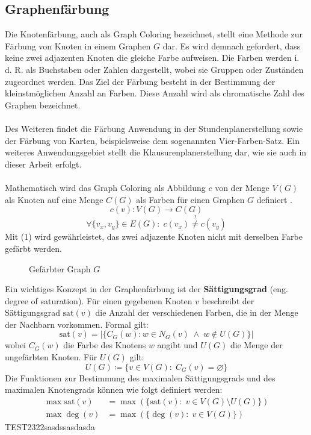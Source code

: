 \subsection{Graphenfärbung}
Die Knotenfärbung, auch als Graph Coloring bezeichnet, stellt eine Methode zur Färbung von Knoten in einem Graphen $G$ dar. 
Es wird demnach gefordert, dass keine zwei adjazenten Knoten die gleiche Farbe aufweisen.
Die Farben werden i. d. R. als Buchstaben oder Zahlen dargestellt, wobei sie Gruppen oder Zuständen zugeordnet werden.
Das Ziel der Färbung besteht in der Bestimmung der kleinstmöglichen Anzahl an Farben.
Diese Anzahl wird als chromatische Zahl des Graphen bezeichnet.\\\\
Des Weiteren findet die Färbung Anwendung in der Stundenplanerstellung sowie der Färbung von Karten, beispielsweise dem sogenannten Vier-Farben-Satz.
Ein weiteres Anwendungsgebiet stellt die Klausurenplanerstellung dar, wie sie auch in dieser Arbeit erfolgt.\\\\
\newpage
\noindent Mathematisch wird das Graph Coloring als Abbildung $c$ von der Menge $V(G)$ als Knoten auf eine Menge $C(G)$ als Farben für einen Graphen $G$ definiert \parencite[121]{Diestel2017-bj}.
\begin{equation*}
c(v): V(G) \rightarrow C(G)
\end{equation*}
\begin{equation}
\forall \{v_x,v_y\} \in E(G) \colon \; c(v_x) \overset{!}{\neq} c(v_y)
\end{equation}
Mit (1) wird gewährleistet, das zwei adjazente Knoten nicht mit derselben Farbe gefärbt werden.
\vspace{-2.25cm}
\begin{figure}[H]
    \centering
    
    \vspace{-2cm}
    \caption{Gefärbter Graph $G$}
\end{figure}
\noindent Ein wichtiges Konzept in der Graphenfärbung ist der \textbf{Sättigungsgrad} (eng. degree of saturation). 
Für einen gegebenen Knoten $v$ beschreibt der Sättigungsgrad $\text{sat}(v)$ die Anzahl der verschiedenen Farben, die in der Menge der Nachbarn vorkommen. Formal gilt: 
\parencite[39]{lewis2021guide}
\begin{equation*}
    \text{sat}(v)=|\{C_G(w)\colon w \in N_G(v) \; \wedge \; w \notin U(G)\}|
\end{equation*}
wobei $C_G(w)$ die Farbe des Knotens $w$ angibt und $U(G)$ die Menge der ungefärbten Knoten. Für $U(G)$ gilt:
\begin{equation*}
    U(G)\coloneqq \{v \in V(G) \colon \;C_G(v) = \varnothing\}
\end{equation*}
Die Funktionen zur Bestimmung des maximalen Sättigungsgrads und des maximalen Knotengrads können wie folgt definiert werden:
\begin{align*}
    \max \text{sat}(v) &= \max(\{\text{sat}(v)\colon \; v \in V(G) \setminus U(G)\})\\
    \max \deg(v) &= \max(\{\deg(v) \colon \; v \in V(G)\})
\end{align*}
TEST2322sasdssasdasda